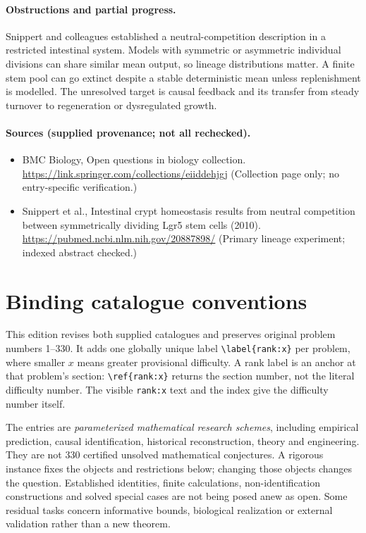 \documentclass[11pt]{article}
\begin{document}
\paragraph{Obstructions and partial progress.} Snippert and colleagues established a neutral-competition description in a restricted intestinal system. Models with symmetric or asymmetric individual divisions can share similar mean output, so lineage distributions matter. A finite stem pool can go extinct despite a stable deterministic mean unless replenishment is modelled. The unresolved target is causal feedback and its transfer from steady turnover to regeneration or dysregulated growth.
\paragraph{Sources (supplied provenance; not all rechecked).} \begin{itemize}
\item BMC Biology, Open questions in biology collection. \url{https://link.springer.com/collections/eiiddehjgj} (Collection page only; no entry-specific verification.)
\item Snippert et al., Intestinal crypt homeostasis results from neutral competition between symmetrically dividing Lgr5 stem cells (2010). \url{https://pubmed.ncbi.nlm.nih.gov/20887898/} (Primary lineage experiment; indexed abstract checked.)
\end{itemize}


\section*{Binding catalogue conventions}
This edition revises both supplied catalogues and preserves original problem numbers 1--330. It adds one globally unique label \verb|\label{rank:x}| per problem, where smaller $x$ means greater provisional difficulty. A rank label is an anchor at that problem's section: \verb|\ref{rank:x}| returns the section number, not the literal difficulty number. The visible \texttt{rank:x} text and the index give the difficulty number itself.

The entries are \emph{parameterized mathematical research schemes}, including empirical prediction, causal identification, historical reconstruction, theory and engineering. They are not 330 certified unsolved mathematical conjectures. A rigorous instance fixes the objects and restrictions below; changing those objects changes the question. Established identities, finite calculations, non-identification constructions and solved special cases are not being posed anew as open. Some residual tasks concern informative bounds, biological realization or external validation rather than a new theorem.
\end{document}

